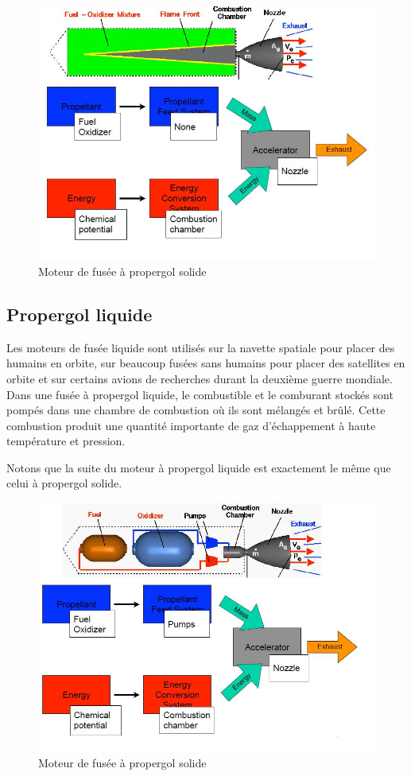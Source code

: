 \documentclass{report}
\begin{document}
\begin{figure}[h!]
    \centering
    \includegraphics[scale=0.7]{40.JPG}
    \caption{Moteur de fusée à propergol solide}
    \label{40}
\end{figure}

\subsection{Propergol liquide}

Les moteurs de fusée liquide sont utilisés sur la navette spatiale pour placer des humains en orbite, sur beaucoup fusées sans humains pour placer des satellites en orbite et sur certains avions de recherches durant la deuxième guerre mondiale. Dans une fusée à propergol liquide, le combustible et le comburant stockés sont pompés dans une chambre de combustion où ils sont mélangés et brûlé. Cette combustion produit une quantité importante de gaz d'échappement à haute température et pression.

Notons que la suite du moteur à propergol liquide est exactement le même que celui à propergol solide.

\begin{figure}[h!]
    \centering
    \includegraphics[scale=0.7]{41.JPG}
    \caption{Moteur de fusée à propergol solide}
    \label{41}
\end{figure}
\end{document}
